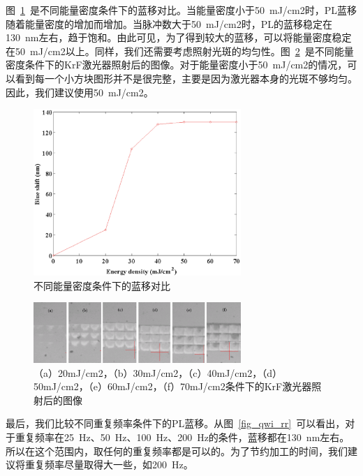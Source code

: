 \documentclass{ZJUthesis}
\begin{document}
图~\ref{fig_qwi_energy}~是不同能量密度条件下的蓝移对比。当能量密度小于50~mJ/cm2时，PL蓝移随着能量密度的增加而增加。当脉冲数大于50~mJ/cm2时，PL的蓝移稳定在130~nm左右，趋于饱和。由此可见，为了得到较大的蓝移，可以将能量密度稳定在50~mJ/cm2以上。同样，我们还需要考虑照射光斑的均匀性。图~\ref{fig_qwi_energy2}~是不同能量密度条件下的KrF激光器照射后的图像。对于能量密度小于50~mJ/cm2的情况，可以看到每一个小方块图形并不是很完整，主要是因为激光器本身的光斑不够均匀。因此，我们建议使用50~mJ/cm2。

\begin{figure}[htbp]
    \centering
    \includegraphics[width=0.7\textwidth]{./Pictures/qwi_energy.eps}
    \caption{不同能量密度条件下的蓝移对比}
    \label{fig_qwi_energy}
\end{figure}

\begin{figure}[htbp]
    \centering
    \includegraphics[width=0.7\textwidth]{./Pictures/qwi_energy2.eps}
    \caption{（a）20mJ/cm2，（b）30mJ/cm2，（c）40mJ/cm2，（d）50mJ/cm2，（e）60mJ/cm2，（f）70mJ/cm2条件下的KrF激光器照射后的图像}
    \label{fig_qwi_energy2}
\end{figure}

最后，我们比较不同重复频率条件下的PL蓝移。从图~\ref{fig_qwi_rr}~可以看出，对于重复频率在25~Hz、50~Hz、100~Hz、200~Hz的条件，蓝移都在130~nm左右。所以在这个范围内，取任何的重复频率都是可以的。为了节约加工的时间，我们建议将重复频率尽量取得大一些，如200~Hz。
\end{document}
